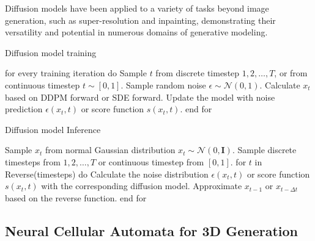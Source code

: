 \documentclass[11pt,a4paper,oneside]{report}
\begin{document}
Diffusion models have been applied to a variety of tasks beyond image generation, such as super-resolution and inpainting, demonstrating their versatility and potential in numerous domains of generative modeling.

\begin{algorithm}
\caption{Diffusion model training \cite{bie2023renaissance}}
\begin{algorithmic}[1]
\STATE for every training iteration do
\STATE \hspace{\algorithmicindent} Sample $t$ from discrete timestep $1, 2, \ldots, T$, or from continuous timestep $t \sim [0, 1]$.
\STATE \hspace{\algorithmicindent} Sample random noise $\epsilon \sim \mathcal{N}(0, 1)$.
\STATE \hspace{\algorithmicindent} Calculate $x_t$ based on DDPM forward or SDE forward.
\STATE \hspace{\algorithmicindent} Update the model with noise prediction $\epsilon(x_t, t)$ or score function $s(x_t, t)$.
\STATE end for
\end{algorithmic}
\label{alg:diffusion_model_training}
\end{algorithm}

\begin{algorithm}
\caption{Diffusion model Inference \cite{bie2023renaissance}}
\begin{algorithmic}[1]
\STATE Sample $x_t$ from normal Gaussian distribution $x_t \sim \mathcal{N}(0, \mathbf{I})$.
\STATE Sample discrete timesteps from $1, 2, \ldots, T$ or continuous timestep from $[0,1]$.
\STATE for $t$ in Reverse(timesteps) do
\STATE \hspace{\algorithmicindent} Calculate the noise distribution $\epsilon(x_t, t)$ or score function $s(x_t, t)$ with the corresponding diffusion model.
\STATE \hspace{\algorithmicindent} Approximate $x_{t-1}$ or $x_{t-\Delta t}$ based on the reverse function.
\STATE end for
\end{algorithmic}
\label{alg:diffusion_model_inference}
\end{algorithm}

\subsection{Neural Cellular Automata for 3D Generation}
\end{document}

